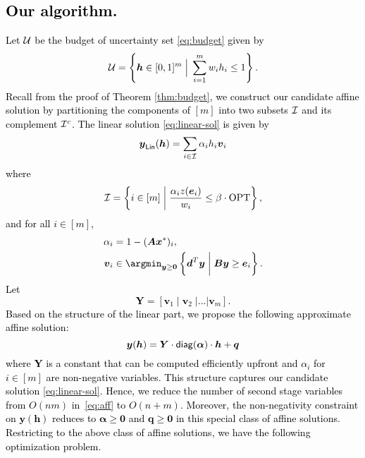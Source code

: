 \documentclass[moor]{informs1}              %
\newcommand{\opt}{\mathrm{OPT}}
\newcommand{\mb}[1]{\ensuremath{\boldsymbol{#1}}}
\newcommand*{\red}{\textcolor{black}}
\begin{document}
\red{
\subsection{Our algorithm.}
Let $\cal U$ be the budget of uncertainty set \eqref{eq:budget} given by
$$ {\cal U} = \left\{ \mb h \in [0,1]^m  \; \Big\vert \;   \sum_{i=1}^m w_i h_i \leq 1 \right\}.$$
Recall from the proof of Theorem  \ref{thm:budget}, we construct our candidate affine solution by partitioning the components of $[m]$ into two subsets $ {\cal  I}$ and its complement $ {\cal  I}^c$.  The linear solution \eqref{eq:linear-sol} is given by 
\begin{equation*} \label{eq:linear-sol-algo}
 \mb y_{\sf Lin}( \mb h )   = \sum_{i \in {\cal I} } \alpha_i h_i {\mb v}_i 
\end{equation*}
 where
$${\cal  I}= \left\{ i \in [m] \; \bigg\vert \;  \frac{\alpha_i z( \mb e_i)}{w_i}   \leq \beta \cdot \opt \right\},$$
and for all $i \in [m]$,
\[
\begin{aligned}
\alpha_i & = 1 -( \mb A \mb x^*)_i, \\
\mb v_i & \in  \argmin_{\mb y \geq \mb 0} \left\{ \mb d^T \mb y \; \bigg\vert \;   \mb B \mb y \geq  \mb e_i  \right\}.
\end{aligned}
\]
Let %
$$ \mb Y = [ \mb v_1 \; \vert \; \mb v_2 \; \vert \ldots \vert \mb v_m ].$$
Based on the structure of the linear part, we propose the following approximate affine solution: 
$$ \mb y ( \mb h )   =  \mb Y \cdot {\sf diag}  ( \mb {\alpha} ) \cdot \mb h + \mb q $$
where  $\mb Y$ is a constant that can be computed efficiently upfront and $   {\alpha}_i $ for $i \in [m]$ are non-negative variables. This structure captures our candidate solution  \eqref{eq:linear-sol}. %
Hence, we reduce the number of second stage variables  from $O(nm)$ in~\eqref{eq:aff} to $O(n+m)$. Moreover, the non-negativity constraint on $ \mb y ( \mb h )$ reduces to $\mb \alpha \geq \mb 0$ and $\mb q \geq \mb 0$ in this special class of affine solutions. Restricting to the above class of affine solutions, we have the following optimization problem.
\begin{equation}\label{eq:aff-approx}

\end{equation}}
\end{document}
